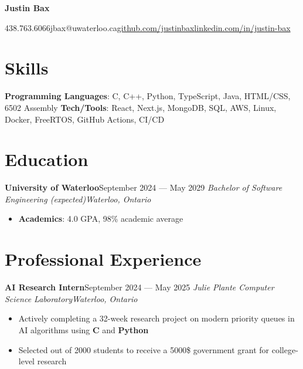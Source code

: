 \documentclass{article}
\newcommand{\cdelim}{\;\textbar\;}
\newcommand{\newrole}[4]{
    {\normalfont\textbf{#1}\hfill#3}
    \newline
    \textit{#2}\hfill\textit{#4}
}
\newenvironment{bulletpoints}{\begin{itemize}\setlength\itemsep{-0.2em}}{\end{itemize}}
\begin{document}
\begin{center}
    {\Huge\bfseries Justin Bax}\\\vspace*{2pt}

    438.763.6066\cdelim jbax@uwaterloo.ca\cdelim\href{https://github.com/justinbax}{github.com/justinbax}\cdelim\href{https://linkedin.com/in/justin-bax}{linkedin.com/in/justin-bax}\\
\end{center}

\section*{Skills}

{\bfseries Programming Languages}: C, C++, Python, TypeScript, Java, HTML/CSS, 6502 Assembly
\newline
{\bfseries Tech/Tools}: React, Next.js, MongoDB, SQL, AWS, Linux, Docker, FreeRTOS, GitHub Actions, CI/CD


\section*{Education}

\newrole{University of Waterloo}{Bachelor of Software Engineering (expected)}{September 2024 --- May 2029}{Waterloo, Ontario}
\begin{bulletpoints}
    \vspace*{-2pt}
    \item {\bfseries Academics}: 4.0 GPA, 98\% academic average
\end{bulletpoints}


\section*{Professional Experience}

\newrole{AI Research Intern}{Julie Plante Computer Science Laboratory}{September 2024 --- May 2025}{Waterloo, Ontario}
\begin{bulletpoints}
    \item Actively completing a 32-week research project on modern priority queues in AI algorithms using \textbf{C} and \textbf{Python}
    \item Selected out of 2000 students to receive a 5000\$ government grant for college-level research
\end{bulletpoints}
\end{document}
